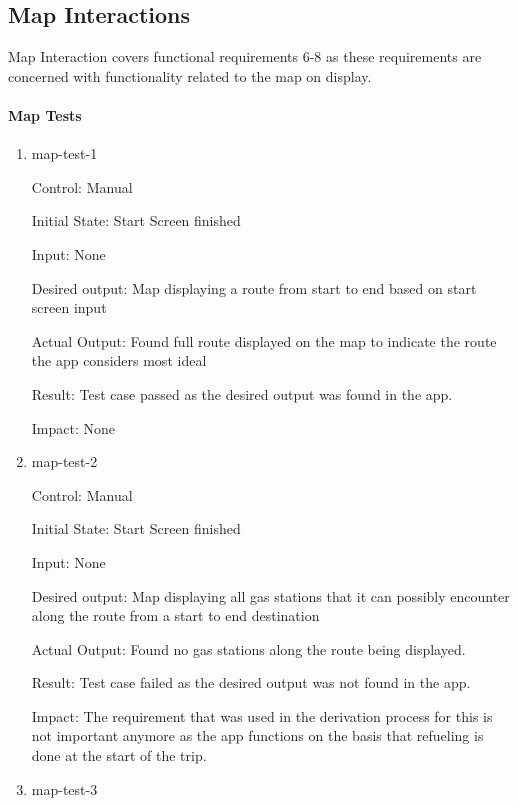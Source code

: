 \documentclass[12pt, titlepage]{article}
\begin{document}
\subsection{Map Interactions}

Map Interaction covers functional requirements 6-8 as these requirements 
are concerned with functionality related to the map on display.
		
\paragraph{Map Tests}

\begin{enumerate}

\item{map-test-1\\}

Control: Manual
					
Initial State: Start Screen finished
					
Input: None

Desired output: Map displaying a route from start to end based on start screen input

Actual Output: Found full route displayed on the map to indicate the route the app considers most ideal

Result: Test case passed as the desired output was found in the app.

Impact: None
					
\item{map-test-2\\}

Control: Manual
					
Initial State: Start Screen finished
					
Input: None

Desired output: Map displaying all gas stations that it can possibly encounter along the route from a start to end destination

Actual Output: Found no gas stations along the route being displayed.

Result: Test case failed as the desired output was not found in the app.

Impact: The requirement that was used in the derivation process for this is not important anymore as the app functions on the basis that refueling 
is done at the start of the trip.
					
\item{map-test-3\\}


\end{enumerate}
\end{document}

